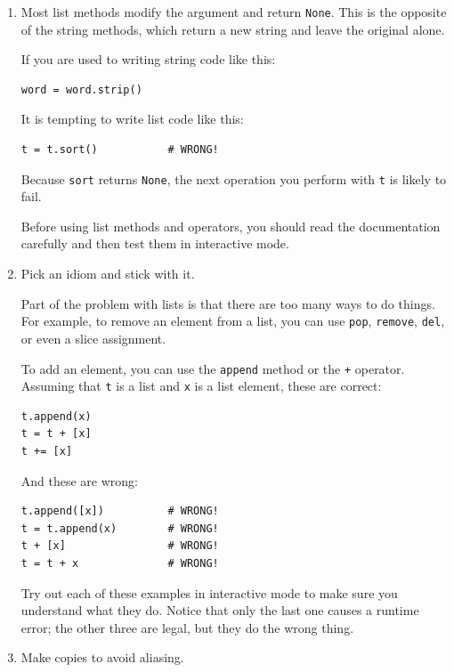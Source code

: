 \documentclass[10pt]{book}
\begin{document}
\begin{enumerate}

\item Most list methods modify the argument and
  return {\tt None}.  This is the opposite of the string methods,
  which return a new string and leave the original alone.

If you are used to writing string code like this:

\begin{verbatim}
word = word.strip()
\end{verbatim}

It is tempting to write list code like this:

\begin{verbatim}
t = t.sort()           # WRONG!
\end{verbatim}

Because {\tt sort} returns {\tt None}, the
next operation you perform with {\tt t} is likely to fail.

Before using list methods and operators, you should read the
documentation carefully and then test them in interactive mode.

\item Pick an idiom and stick with it.

Part of the problem with lists is that there are too many
ways to do things.  For example, to remove an element from
a list, you can use {\tt pop}, {\tt remove}, {\tt del},
or even a slice assignment.

To add an element, you can use the {\tt append} method or
the {\tt +} operator.  Assuming that {\tt t} is a list and
{\tt x} is a list element, these are correct:

\begin{verbatim}
t.append(x)
t = t + [x]
t += [x]
\end{verbatim}

And these are wrong:

\begin{verbatim}
t.append([x])          # WRONG!
t = t.append(x)        # WRONG!
t + [x]                # WRONG!
t = t + x              # WRONG!
\end{verbatim}

Try out each of these examples in interactive mode to make sure
you understand what they do.  Notice that only the last
one causes a runtime error; the other three are legal, but they
do the wrong thing.


\item Make copies to avoid aliasing.


\end{enumerate}
\end{document}
